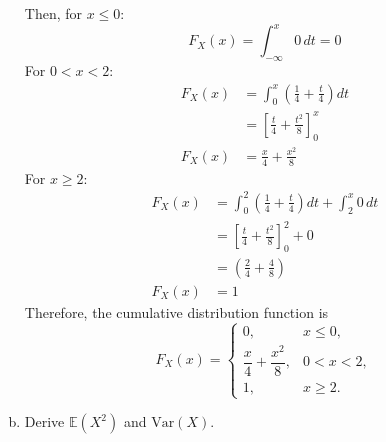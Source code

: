 \documentclass[letterpaper,12pt]{article}
\begin{document}
\begin{enumerate}[(a)]
\begin{list}{}{}
        Then, for $x \le 0$:
        \[        F_X(x) = \int_{-\infty}^{x} 0 \, dt = 0        \]
        For $0 < x < 2$:
        \begin{align*}
        F_X(x) &= \int_{0}^{x} \left(\frac{1}{4} + \frac{t}{4}\right) dt \\
        &= \left[ \frac{t}{4} + \frac{t^2}{8} \right]_{0}^{x} \\
         F_X(x)&= \frac{x}{4} + \frac{x^2}{8}
        \end{align*}
        For $x \ge 2$:
        \begin{align*}
        F_X(x) &= \int_{0}^{2} \left(\frac{1}{4} + \frac{t}{4}\right) dt + \int_{2}^{x} 0 \, dt \\
        &= \left[ \frac{t}{4} + \frac{t^2}{8} \right]_{0}^{2} + 0 \\
        &= \left( \frac{2}{4} + \frac{4}{8} \right) \\
         F_X(x) &= 1
        \end{align*}
        Therefore, the cumulative distribution function is
        \[        \boxed{ F_X(x) =
        \begin{cases}
        0, & x \le 0, \\
        \dfrac{x}{4} + \dfrac{x^2}{8}, & 0 < x < 2, \\
        1, & x \ge 2.
        \end{cases}}
        \]
    \end{list}
    \item Derive $\mathbb{E}(X^2)$ and $\text{Var}(X)$.
   \vspace{0.5em}
\end{enumerate}
\end{document}
